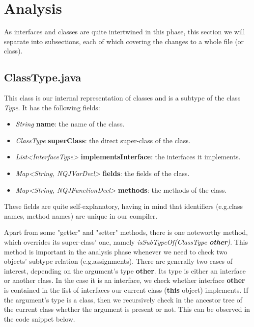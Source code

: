 \section{Analysis}
\label{sec:analysis}
As interfaces and classes are quite intertwined in this phase, 
this section we will separate into subsections, each of which covering
the changes to a whole file (or class).

\subsection{ClassType.java}
\label{subsec:classType}
This class is our internal representation of classes and is a subtype of the class \textit{Type}.
It has the following fields:
\begin{itemize}
    \item \textit{String} \textbf{name}: the name of the class.
    \item \textit{ClassType} \textbf{superClass}: the direct super-class of the class.
    \item \textit{List<InterfaceType>} \textbf{implementsInterface}: the interfaces it implements.
    \item \textit{Map<String, NQJVarDecl>} \textbf{fields}: the fields of the class.
    \item \textit{Map<String, NQJFunctionDecl>} \textbf{methods}: the methods of the class.
\end{itemize}
These fields are quite self-explanatory, having in mind that identifiers 
(e.g.\@ class names, method names) are unique in our compiler.

Apart from some "getter" and "setter" methods, there is one noteworthy method, which
overrides its super-class' one, namely \textit{isSubTypeOf(ClassType \textbf{other})}.
This method is important in the analysis phase whenever we need
to check two objects' subtype relation (e.g.\@ assignments).
There are generally two cases of interest, depending on the argument's type
\textbf{other}. Its type is either an interface or another class.
In the case it is an interface, we check whether interface \textbf{other} is contained
in the list of interfaces our current class (\textbf{this} object) implements.
If the argument's type is a class, then we recursively check in the ancestor tree
of the current class whether the argument is present or not.
This can be observed in the code snippet below.


